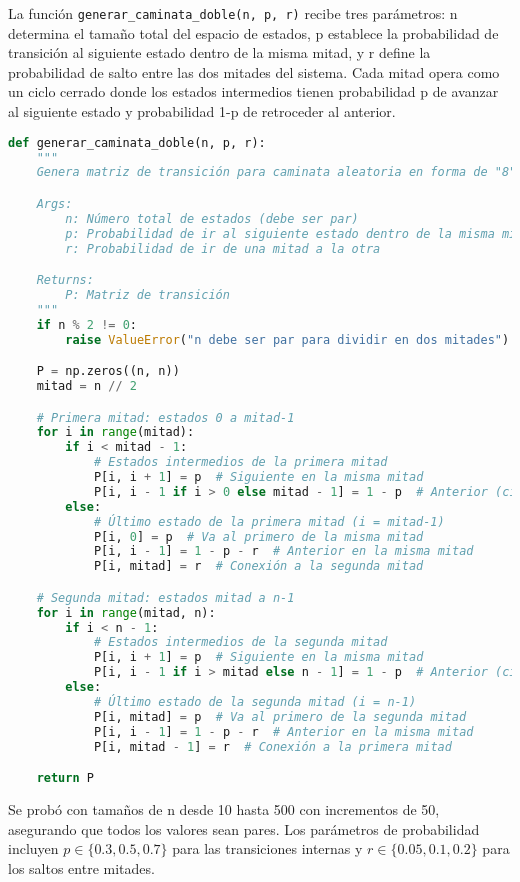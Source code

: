 La función \texttt{generar\_caminata\_doble(n, p, r)} recibe tres parámetros: n determina el tamaño total del espacio de estados, p establece la probabilidad de transición al siguiente estado dentro de la misma mitad, y r define la probabilidad de salto entre las dos mitades del sistema. Cada mitad opera como un ciclo cerrado donde los estados intermedios tienen probabilidad p de avanzar al siguiente estado y probabilidad 1-p de retroceder al anterior.

\begin{lstlisting}[language=Python]
def generar_caminata_doble(n, p, r):
    """
    Genera matriz de transición para caminata aleatoria en forma de "8".

    Args:
        n: Número total de estados (debe ser par)
        p: Probabilidad de ir al siguiente estado dentro de la misma mitad
        r: Probabilidad de ir de una mitad a la otra

    Returns:
        P: Matriz de transición
    """
    if n % 2 != 0:
        raise ValueError("n debe ser par para dividir en dos mitades")

    P = np.zeros((n, n))
    mitad = n // 2

    # Primera mitad: estados 0 a mitad-1
    for i in range(mitad):
        if i < mitad - 1:
            # Estados intermedios de la primera mitad
            P[i, i + 1] = p  # Siguiente en la misma mitad
            P[i, i - 1 if i > 0 else mitad - 1] = 1 - p  # Anterior (cíclico)
        else:
            # Último estado de la primera mitad (i = mitad-1)
            P[i, 0] = p  # Va al primero de la misma mitad
            P[i, i - 1] = 1 - p - r  # Anterior en la misma mitad
            P[i, mitad] = r  # Conexión a la segunda mitad

    # Segunda mitad: estados mitad a n-1
    for i in range(mitad, n):
        if i < n - 1:
            # Estados intermedios de la segunda mitad
            P[i, i + 1] = p  # Siguiente en la misma mitad
            P[i, i - 1 if i > mitad else n - 1] = 1 - p  # Anterior (cíclico)
        else:
            # Último estado de la segunda mitad (i = n-1)
            P[i, mitad] = p  # Va al primero de la segunda mitad
            P[i, i - 1] = 1 - p - r  # Anterior en la misma mitad
            P[i, mitad - 1] = r  # Conexión a la primera mitad

    return P
\end{lstlisting}

Se probó con tamaños de n desde 10 hasta 500 con incrementos de 50, asegurando que todos los valores sean pares. Los parámetros de probabilidad incluyen $p \in \{0.3, 0.5, 0.7\}$ para las transiciones internas y $r \in \{0.05, 0.1, 0.2\}$ para los saltos entre mitades.

